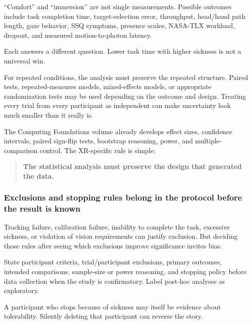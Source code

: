 ``Comfort'' and ``immersion'' are not single measurements. Possible outcomes include task completion time, target-selection error, throughput, head/hand path length, gaze behavior, SSQ symptoms, presence scales, NASA-TLX workload, dropout, and measured motion-to-photon latency.

Each answers a different question. Lower task time with higher sickness is not a universal win.

For repeated conditions, the analysis must preserve the repeated structure. Paired tests, repeated-measures models, mixed-effects models, or appropriate randomization tests may be used depending on the outcome and design. Treating every trial from every participant as independent can make uncertainty look much smaller than it really is.

The Computing Foundations volume already develops effect sizes, confidence intervals, paired sign-flip tests, bootstrap reasoning, power, and multiple-comparison control. The XR-specific rule is simple:

\begin{quote}
\textbf{The statistical analysis must preserve the design that generated the data.}
\end{quote}

\subsubsection{Exclusions and stopping rules belong in the protocol before the result is known}\label{04-visual-computing-ii-ch035-exclusions-and-stopping-rules-belong-in-the-protocol-before-the-result-is-known}

\hypertarget{04-visual-computing-ii-ch035-exclusions-and-stopping-rules-belong-in-the-protocol-before-the-result-is-known}{}

Tracking failure, calibration failure, inability to complete the task, excessive sickness, or violation of vision requirements can justify exclusion. But deciding those rules after seeing which exclusions improve significance invites bias.

State participant criteria, trial/participant exclusions, primary outcomes, intended comparisons, sample-size or power reasoning, and stopping policy before data collection when the study is confirmatory. Label post-hoc analyses as exploratory.

A participant who stops because of sickness may itself be evidence about tolerability. Silently deleting that participant can reverse the story.

